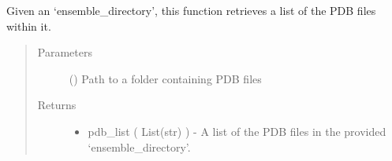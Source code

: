 \documentclass[letterpaper,12pt,english,openany,oneside]{sphinxmanual}
\begin{document}
\begin{fulllineitems}
\label{\detokenize{ensembles:ensembles.ens_build.get_pdb_list}}
Given an ‘ensemble\_directory’, this function retrieves a list of the PDB files within it.
\begin{quote}\begin{description}
\item[{Parameters}] \leavevmode
{} () \textendash{} Path to a folder containing PDB files

\item[{Returns}] \leavevmode
\begin{itemize}
\item {} 
pdb\_list ( List(str) ) - A list of the PDB files in the provided ‘ensemble\_directory’.

\end{itemize}


\end{description}\end{quote}

\end{fulllineitems}

\end{document}
